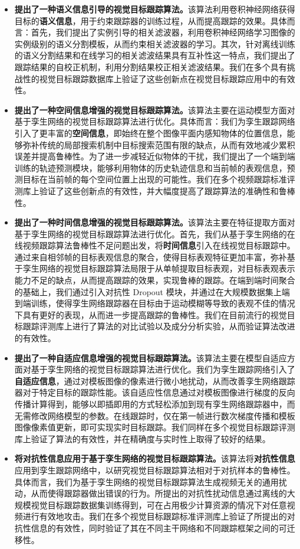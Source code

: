 \begin{itemize}
\item{\textbf{提出了一种语义信息引导的视觉目标跟踪算法。}该算法利用卷积神经网络获得目标的\textbf{语义信息}，用于约束跟踪器的训练过程，从而提高跟踪的效果。具体而言：首先，我们提出了实例引导的相关滤波器，利用卷积神经网络学习图像的实例级别的语义分割模板，从而约束相关滤波器的学习。其次，针对离线训练的语义分割结果和在线学习的相关滤波结果具有互补性这一特点，我们提出了跟踪结果的自校正机制，利用分割结果校正相关滤波结果。我们在多个具有挑战性的视觉目标跟踪数据库上验证了这些创新点在视觉目标跟踪应用中的有效性。}
\item{\textbf{提出了一种空间信息增强的视觉目标跟踪算法。}该算法主要在运动模型方面对基于孪生网络的视觉目标跟踪算法进行优化。具体而言：我们为孪生跟踪网络引入了更丰富的\textbf{空间信息}，即始终在整个图像平面内感知物体的位置信息，能够弥补传统的局部搜索机制中目标搜索范围有限的缺点，从而有效地减少累积误差并提高鲁棒性。为了进一步减轻近似物体的干扰，我们提出了一个端到端训练的轨迹预测模块，能够利用物体的历史轨迹信息和当前帧的表观信息，预测目标在当前帧的每个空间位置上出现的可能性。我们在多个视频跟踪标准评测库上验证了这些创新点的有效性，并大幅度提高了跟踪算法的准确性和鲁棒性。}
\item{\textbf{提出了一种时间信息增强的视觉目标跟踪算法。}该算法主要在特征提取方面对基于孪生网络的视觉目标跟踪算法进行优化。首先，我们从基于孪生网络的在线视频跟踪算法鲁棒性不足问题出发，将\textbf{时间信息}引入在线视觉目标跟踪中。通过来自相邻帧的目标表观信息的聚合，使得目标表观特征更加丰富，弥补基于孪生网络的视觉目标跟踪算法局限于从单帧提取目标表观，对目标表观表示能力不足的缺点，从而提高跟踪的效果，实现鲁棒的跟踪。在端到端时间聚合的基础上，我们通过引入对抗性 Dropout 模块，并通过在大规模数据集上端到端训练，使得孪生网络跟踪器在目标由于运动模糊等导致的表观不佳的情况下具有更好的表现，从而进一步提高跟踪的鲁棒性。我们在目前流行的视觉目标跟踪评测库上进行了算法的对比试验以及成分分析实验，从而验证算法改进的有效性。}
\item{\textbf{提出了一种自适应信息增强的视觉目标跟踪算法。}该算法主要在模型自适应方面对基于孪生网络的视觉目标跟踪算法进行优化。我们为孪生跟踪网络引入了\textbf{自适应信息}，通过对模板图像的像素进行微小地扰动，从而改善孪生网络跟踪器对于特定目标的跟踪性能。该自适应性信息通过对模板图像进行梯度的反向传播计算得到，能够以即插即用的方式轻松添加到现有孪生网络跟踪器中，而无需修改网络模型的参数。在线跟踪时，仅在第一帧进行数次梯度传播和模板图像像素值更新，即可实现实时目标跟踪。我们同样在多个视觉目标跟踪评测库上验证了算法的有效性，并在精确度与实时性上取得了较好的结果。}
\item{\textbf{将对抗性信息应用于基于孪生网络的视觉目标跟踪算法。}该算法将\textbf{对抗性信息}应用到孪生跟踪网络中，以研究视觉目标跟踪算法相对于对抗样本的鲁棒性。具体而言，我们为基于孪生网络的视觉目标跟踪算法生成视频无关的通用扰动，从而使得跟踪器做出错误的行为。所提出的对抗性扰动信息通过离线的大规模视觉目标跟踪数据集训练得到，可在占用极少计算资源的情况下对任意视频进行有效地攻击。我们在多个视觉目标跟踪标准评测库上验证了所提出的对抗性信息的有效性，同时验证了其在不同主干网络和不同跟踪框架之间的可迁移性。}
\end{itemize}


